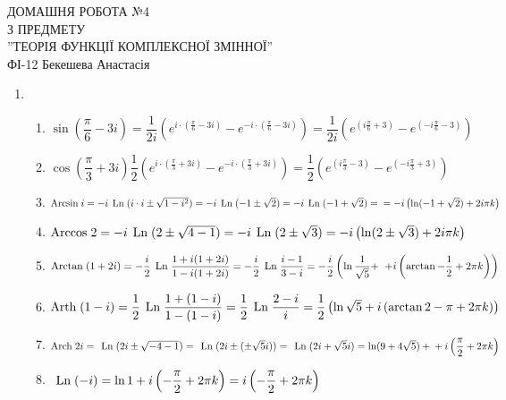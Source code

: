 \documentclass[a4paper,12pt]{article}
\newcommand{\Arcsin}[0]{\textrm{Arcsin\hspace*{0.1cm}}}
\newcommand{\Ln}[0]{\textrm{\hspace*{0.15cm}Ln\hspace*{0.1cm}}}
\newcommand{\Arccos}[0]{\textrm{Arccos\hspace*{0.1cm}}}
\newcommand{\Arctan}[0]{\textrm{Arctan\hspace*{0.1cm}}}
\newcommand{\Arth}[0]{\textrm{Arth\hspace*{0.1cm}}}
\newcommand{\Arch}[0]{\textrm{Arch\hspace*{0.1cm}}}
\begin{document}
	\begin{justify}
		\thispagestyle{empty}\setlength{\parindent}{0pt}
 		\vspace*{\fill}
  		\begin{center}
  			\noindent\makebox[\linewidth]{\rule{\paperwidth}{0.4pt}}
   			\LARGE{\bigbreak ДОМАШНЯ РОБОТА №4\\З ПРЕДМЕТУ\\''ТЕОРІЯ ФУНКЦІЇ КОМПЛЕКСНОЇ ЗМІННОЇ''\\\bigbreak} 
   			ФІ-12 Бекешева Анастасія 
   			\noindent\makebox[\linewidth]{\rule{\paperwidth}{0.4pt}}
  		\end{center}
 		\vspace*{\fill}\newpage
 		\begin{enumerate}
 			\item \begin{enumerate}
 				\item $\sin\left(\dfrac\pi6-3i\right)=\dfrac1{2i}\left(e^{i\cdot\left(\frac\pi6-3i\right)}-e^{-i\cdot\left(\frac\pi6-3i\right)}\right)=\dfrac1{2i}\left(e^{\left(i\frac\pi6+3\right)}-e^{\left(-i\frac\pi6-3\right)}\right)$
 				\item $\cos\left(\dfrac\pi3+3i\right)\dfrac1{2}\left(e^{i\cdot\left(\frac\pi3+3i\right)}-e^{-i\cdot\left(\frac\pi3+3i\right)}\right)=\dfrac1{2}\left(e^{\left(i\frac\pi3-3\right)}-e^{\left(-i\frac\pi3+3\right)}\right)$
 				\item $\Arcsin i=-i\Ln(i\cdot i\pm\sqrt{1-i^2})=-i\Ln(-1\pm\sqrt{2})=-i\Ln(-1+\sqrt{2})=\\=-i\left(\ln(-1+\sqrt2)+2i\pi k\right)$
 				\item $\Arccos 2=-i\Ln(2\pm\sqrt{4-1})=-i\Ln(2\pm\sqrt3)=-i\left(\ln(2\pm\sqrt3)+2i\pi k\right)$
 				\item $\Arctan(1+2i)=-\dfrac i2\Ln\dfrac{1+i(1+2i)}{1-i(1+2i)}=-\dfrac i2\Ln\dfrac{i-1}{3-i}=-\dfrac i2\left(\ln\dfrac1{\sqrt5}+\right.\\\left.+i\left(\arctan-\dfrac12+2\pi k\right)\right)$
 				\item $\Arth(1-i)=\dfrac12\Ln\dfrac{1+(1-i)}{1-(1-i)}=\dfrac12\Ln\dfrac{2-i}{i}=\dfrac12\left(\ln\sqrt5+i\left(\arctan2-\pi+2\pi k\right)\right)$
 				\item $\Arch 2i=\Ln(2i\pm\sqrt{-4-1})=\Ln(2i\pm(\pm\sqrt5 i))=\Ln(2i+\sqrt5i)=\ln(9+4\sqrt5)+\\+i\left(\dfrac\pi2+2\pi k\right)$
 				\item $\Ln (-i)=\ln 1+i\left(-\dfrac\pi2+2\pi k\right)=i\left(-\dfrac\pi2+2\pi k\right)$

\end{enumerate}
\end{enumerate}
\end{justify}
\end{document}
